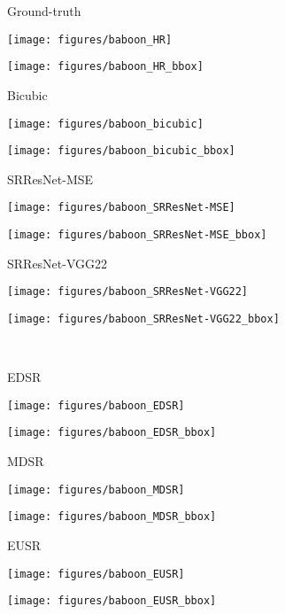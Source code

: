 \documentclass[runningheads]{llncs}
\begin{document}
\begin{figure*}[]
	\centering
	\begin{minipage}[b]{0.24\linewidth}
		\centering
		\centerline{\scriptsize{Ground-truth}}\medskip
		\centerline{\texttt{[image: figures/baboon\_HR]}}\smallskip
		\centerline{\texttt{[image: figures/baboon\_HR\_bbox]}}
	\end{minipage}
	\begin{minipage}[b]{0.24\linewidth}
		\centering
		\centerline{\scriptsize{Bicubic}}\medskip
		\centerline{\texttt{[image: figures/baboon\_bicubic]}}\smallskip
		\centerline{\texttt{[image: figures/baboon\_bicubic\_bbox]}}
	\end{minipage}
	\begin{minipage}[b]{0.24\linewidth}
		\centering
		\centerline{\scriptsize{SRResNet-MSE}}\medskip
		\centerline{\texttt{[image: figures/baboon\_SRResNet-MSE]}}\smallskip
		\centerline{\texttt{[image: figures/baboon\_SRResNet-MSE\_bbox]}}
	\end{minipage}
	\begin{minipage}[b]{0.24\linewidth}
		\centering
		\centerline{\scriptsize{SRResNet-VGG22}}\medskip
		\centerline{\texttt{[image: figures/baboon\_SRResNet-VGG22]}}\smallskip
		\centerline{\texttt{[image: figures/baboon\_SRResNet-VGG22\_bbox]}}
	\end{minipage}
	\medskip \\ \medskip
	\begin{minipage}[b]{0.24\linewidth}
		\centering
		\centerline{\scriptsize{EDSR}}\medskip
		\centerline{\texttt{[image: figures/baboon\_EDSR]}}\smallskip
		\centerline{\texttt{[image: figures/baboon\_EDSR\_bbox]}}
	\end{minipage}
	\begin{minipage}[b]{0.24\linewidth}
		\centering
		\centerline{\scriptsize{MDSR}}\medskip
		\centerline{\texttt{[image: figures/baboon\_MDSR]}}\smallskip
		\centerline{\texttt{[image: figures/baboon\_MDSR\_bbox]}}
	\end{minipage}
	\begin{minipage}[b]{0.24\linewidth}
		\centering
		\centerline{\scriptsize{EUSR}}\medskip
		\centerline{\texttt{[image: figures/baboon\_EUSR]}}\smallskip
		\centerline{\texttt{[image: figures/baboon\_EUSR\_bbox]}}

\end{minipage}
\end{figure*}
\end{document}

